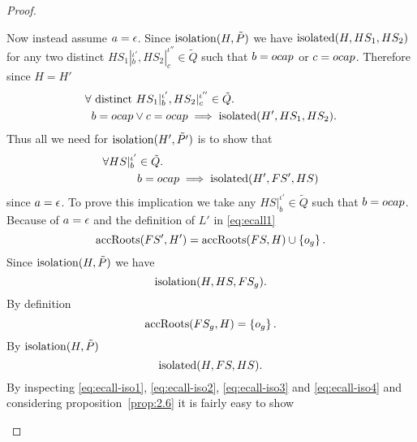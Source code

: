 \begin{proof}
\begin{description}
\begin{description}
          Now instead assume $a = \mbox{$\epsilon$}$. Since $\mbox{$\mathrm{isolation}$}(H, \tilde{P})$ we have
          $\mbox{$\mathrm{isolated}$}(H, HS_1, HS_2)$ for any two distinct $HS_1|_b^{\iota'},
          HS_2|_c^{\iota''}
          \in \tilde{Q}$ such that $b = \mbox{$ocap$}$ or $c = \mbox{$ocap$}$. Therefore since $H = H'$
          \begin{equation}
            \begin{aligned}
              \forall &\text{ distinct } HS_1|_b^{\iota'}, HS_2|_c^{\iota''} \in \tilde{Q}. \\ 
              & b = \mbox{$ocap$} \lor c = \mbox{$ocap$} \implies \mbox{$\mathrm{isolated}$}(H', HS_1, HS_2).
            \end{aligned}
          \end{equation}
          Thus all we need for $\mbox{$\mathrm{isolation}$}(H', \tilde{P'})$ is to show that
          \begin{equation}
            \begin{aligned}
              \forall HS|_b^{\iota'} &\in \tilde{Q} . \\
              &b = \mbox{$ocap$} \implies \mbox{$\mathrm{isolated}$}(H', FS', HS)
            \end{aligned}
          \end{equation}
          since $a = \mbox{$\epsilon$}$. To prove this implication we take any
          $HS|_b^{\iota'} \in
          \tilde{Q}$ such that $b = \mbox{$ocap$}$. Because of $a = \mbox{$\epsilon$}$ and the
          definition of $L'$ in \eqref{eq:ecall1}
          \begin{equation} \label{eq:ecall-iso1}
            \mbox{$\mathrm{accRoots}$}(FS', H') = \mbox{$\mathrm{accRoots}$}(FS, H) \cup \left\{ o_g \right\}.
          \end{equation}
          Since $\mbox{$\mathrm{isolation}$}(H, \tilde{P})$ we have
          \begin{equation} \label{eq:ecall-iso2}
            \mbox{$\mathrm{isolation}$}(H, HS, FS_g).
          \end{equation}
          By definition
          \begin{equation} \label{eq:ecall-iso3}
            \mbox{$\mathrm{accRoots}$}(FS_g, H) = \left\{o_g \right\}.
          \end{equation}
          By $\mbox{$\mathrm{isolation}$}(H, \tilde{P})$ 
          \begin{equation} \label{eq:ecall-iso4}
            \mbox{$\mathrm{isolated}$}(H, FS, HS).
          \end{equation}
          By inspecting \eqref{eq:ecall-iso1}, \eqref{eq:ecall-iso2},
          \eqref{eq:ecall-iso3} and \eqref{eq:ecall-iso4} and considering
          proposition~\ref{prop:2.6} it is fairly easy to show

\end{description}
\end{description}
\end{proof}
